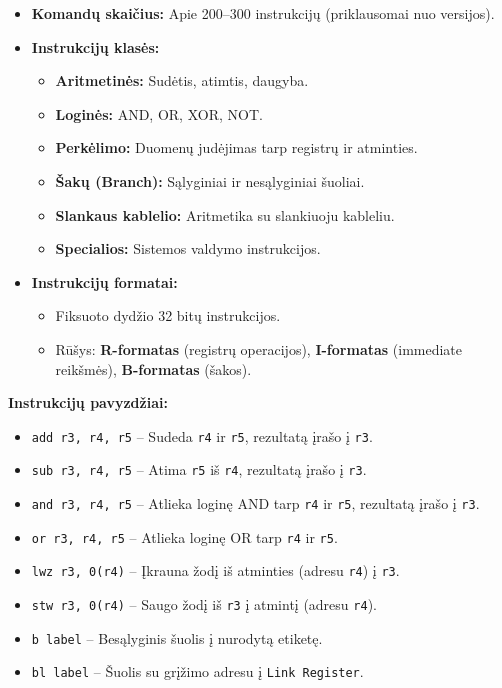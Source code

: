 \documentclass{article}
\begin{document}
\begin{itemize}
    \item \textbf{Komandų skaičius:} Apie 200–300 instrukcijų (priklausomai nuo versijos).
    \item \textbf{Instrukcijų klasės:}
        \begin{itemize}
            \item \textbf{Aritmetinės:} Sudėtis, atimtis, daugyba.
            \item \textbf{Loginės:} AND, OR, XOR, NOT.
            \item \textbf{Perkėlimo:} Duomenų judėjimas tarp registrų ir atminties.
            \item \textbf{Šakų (Branch):} Sąlyginiai ir nesąlyginiai šuoliai.
            \item \textbf{Slankaus kablelio:} Aritmetika su slankiuoju kableliu.
            \item \textbf{Specialios:} Sistemos valdymo instrukcijos.
        \end{itemize}
    \item \textbf{Instrukcijų formatai:}
        \begin{itemize}
            \item Fiksuoto dydžio 32 bitų instrukcijos.
            \item Rūšys: \textbf{R-formatas} (registrų operacijos), \textbf{I-formatas} (immediate reikšmės), \textbf{B-formatas} (šakos).
        \end{itemize}
\end{itemize}

\textbf{Instrukcijų pavyzdžiai:}
\begin{itemize}
    \item \texttt{add r3, r4, r5} – Sudeda \texttt{r4} ir \texttt{r5}, rezultatą įrašo į \texttt{r3}.
    \item \texttt{sub r3, r4, r5} – Atima \texttt{r5} iš \texttt{r4}, rezultatą įrašo į \texttt{r3}.
    \item \texttt{and r3, r4, r5} – Atlieka loginę AND tarp \texttt{r4} ir \texttt{r5}, rezultatą įrašo į \texttt{r3}.
    \item \texttt{or r3, r4, r5} – Atlieka loginę OR tarp \texttt{r4} ir \texttt{r5}.
    \item \texttt{lwz r3, 0(r4)} – Įkrauna žodį iš atminties (adresu \texttt{r4}) į \texttt{r3}.
    \item \texttt{stw r3, 0(r4)} – Saugo žodį iš \texttt{r3} į atmintį (adresu \texttt{r4}).
    \item \texttt{b label} – Besąlyginis šuolis į nurodytą etiketę.
    \item \texttt{bl label} – Šuolis su grįžimo adresu į \texttt{Link Register}.
\end{itemize}
\end{document}
